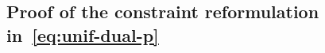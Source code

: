 \documentclass[12pt]{article}
\theoremstyle{thmstyleone}%
\theoremstyle{thmstyletwo}%
\theoremstyle{thmstylethree}%
\newcommand{\reviewChanges}{}
\begin{document}
\begin{appendices}
\section{Proof of the constraint reformulation in~\eqref{eq:unif-dual-p}}
\fi
\label{app:dual_form-p}

\end{appendices}
\end{document}
